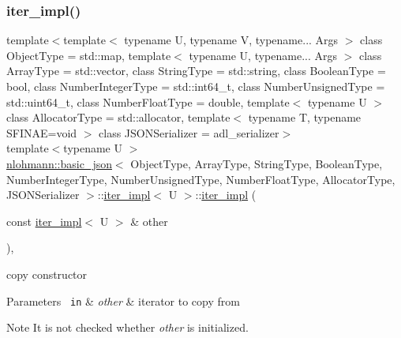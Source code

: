 \subsubsection{\texorpdfstring{iter\_impl()}{iter\_impl()}\hspace{0.1cm}{\footnotesize\ttfamily [3/3]}}
{\footnotesize\ttfamily template$<$template$<$ typename U, typename V, typename... Args $>$ class Object\+Type = std\+::map, template$<$ typename U, typename... Args $>$ class Array\+Type = std\+::vector, class String\+Type  = std\+::string, class Boolean\+Type  = bool, class Number\+Integer\+Type  = std\+::int64\+\_\+t, class Number\+Unsigned\+Type  = std\+::uint64\+\_\+t, class Number\+Float\+Type  = double, template$<$ typename U $>$ class Allocator\+Type = std\+::allocator, template$<$ typename T, typename S\+F\+I\+N\+A\+E=void $>$ class J\+S\+O\+N\+Serializer = adl\+\_\+serializer$>$ \\
template$<$typename U $>$ \\
\mbox{\hyperlink{classnlohmann_1_1basic__json}{nlohmann\+::basic\+\_\+json}}$<$ Object\+Type, Array\+Type, String\+Type, Boolean\+Type, Number\+Integer\+Type, Number\+Unsigned\+Type, Number\+Float\+Type, Allocator\+Type, J\+S\+O\+N\+Serializer $>$\+::\mbox{\hyperlink{classnlohmann_1_1basic__json_1_1iter__impl}{iter\+\_\+impl}}$<$ U $>$\+::\mbox{\hyperlink{classnlohmann_1_1basic__json_1_1iter__impl}{iter\+\_\+impl}} (\begin{DoxyParamCaption}\item[{const \mbox{\hyperlink{classnlohmann_1_1basic__json_1_1iter__impl}{iter\+\_\+impl}}$<$ U $>$ \&}]{other }\end{DoxyParamCaption})\hspace{0.3cm}{\ttfamily [inline]}, {\ttfamily [noexcept]}}



copy constructor 


\begin{DoxyParams}[1]{Parameters}
\mbox{\texttt{ in}}  & {\em other} & iterator to copy from \\
\hline
\end{DoxyParams}
\begin{DoxyNote}{Note}
It is not checked whether {\itshape other} is initialized. 
\end{DoxyNote}


